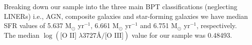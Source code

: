 Breaking down our sample into the three main BPT classifications (neglecting LINERs) i.e., AGN, composite galaxies and star-forming galaxies we have median SFR values of 5.637 M$_{\odot}$ yr$^{-1}$, 6.661 M$_{\odot}$ yr$^{-1}$ and 6.751 M$_{\odot}$ yr$^{-1}$, respectively. The median $\log{(\text{[O II] }{\lambda}3727Å\text{/[O III]})}$ value for our sample was 0.48493. 



